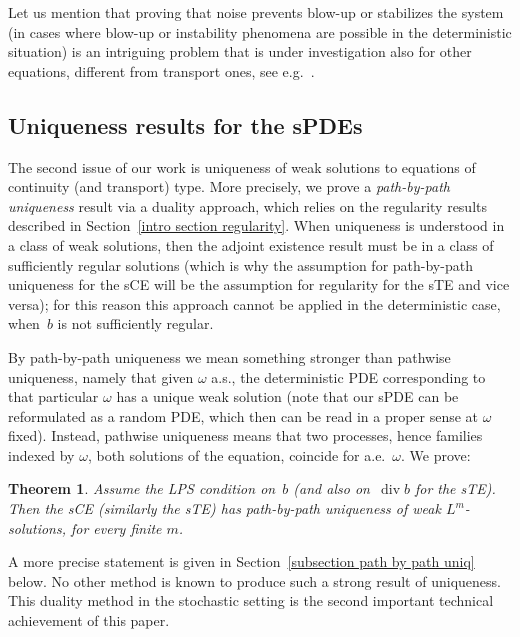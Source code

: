 \documentclass[a4paper,10pt]{article}
\newtheorem{theorem}{Theorem}[section]
\newcommand\1{\mathbbm{1}}
\DeclareMathOperator{\diverg}{div}
\numberwithin{equation}{section}
\begin{document}
Let us mention that proving that noise prevents blow-up or stabilizes the system (in cases where blow-up or instability phenomena are possible in the deterministic situation) is an intriguing
problem that is under investigation also for other equations, different from transport ones, see e.g.\ \cite{BARROCZHA17,BIABLOYAN16,CARCRALANROB07,CHOGUB15,DEBTSU11,DELFLAVIN14,DUBREV17,FLAGUBPRI10a,FLAMAUNEK14,GESSOU17,SCHEUTZOW93}.

\subsection{Uniqueness results for the sPDEs\label{intro section uniqueness}}

The second issue of our work is uniqueness of weak solutions to equations of continuity (and transport) type. More precisely, we prove a \textit{path-by-path uniqueness} result via a duality approach, which relies on the regularity results described in Section~\ref{intro section regularity}. When uniqueness is understood in a class of weak solutions, then the adjoint existence result must be in a class of sufficiently regular solutions (which is why the assumption for path-by-path uniqueness for the sCE will be the assumption for regularity for the sTE and vice versa); for this reason this approach cannot be applied in the deterministic case, when~$b$ is not sufficiently regular.

By path-by-path uniqueness we mean something stronger than pathwise uniqueness, namely that given $\omega $ a.s., the deterministic PDE
corresponding to that particular $\omega $ has a unique weak solution (note that our sPDE can be reformulated as a random PDE, which then can be read in a proper sense at $\omega$ fixed). Instead, pathwise uniqueness means that two processes, hence families indexed by $\omega $, both solutions of the equation, coincide for a.e.~$\omega $. We prove:

\begin{theorem}
Assume the LPS condition on~$b$ \textup{(}and also on~$\diverg b$ for the sTE\textup{)}. Then the sCE \textup{(}similarly the sTE\textup{)} has path-by-path uniqueness of weak $L^{m}$-solutions, for every finite $m$.
\end{theorem}

A more precise statement is given in Section~\ref{subsection path by path uniq} below. No other method is known to produce such a strong result of uniqueness. This duality method in the stochastic setting is the second important technical achievement of this paper.
\end{document}
